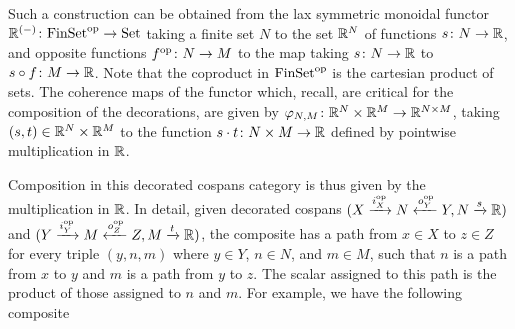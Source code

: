 Such a construction can be obtained from the lax symmetric monoidal functor
$\mathbb R^{(-)}{\colon} \mathrm{FinSet}^{\mathrm{op}} \to \mathrm{Set}$ taking a finite set $N$ to the set
${\mathbb{R}}^N$ of functions $s{\colon} N \to {\mathbb{R}}$, and opposite functions $f^{\mathrm{op}}{\colon} N \to
M$ to the map taking $s{\colon} N \to {\mathbb{R}}$ to $s \circ f {\colon} M \to {\mathbb{R}}$. Note that
the coproduct in $\mathrm{FinSet}^{\mathrm{op}}$ is the cartesian product of sets. The coherence
maps of the functor which, recall, are critical for the composition of the
decorations, are given by $\varphi_{N,M}{\colon} {\mathbb{R}}^N \times {\mathbb{R}}^M \to {\mathbb{R}}^{N\times
M}$, taking $(s,t) \in {\mathbb{R}}^N \times {\mathbb{R}}^M$ to the function $s \cdot t{\colon} N
\times M \to {\mathbb{R}}$ defined by pointwise multiplication in ${\mathbb{R}}$. 

Composition in this decorated cospans category is thus given by the
multiplication in ${\mathbb{R}}$. In detail, given decorated cospans $(X
\xrightarrow{i_X^{\mathrm{op}}} N \xleftarrow{o_Y^{\mathrm{op}}} Y, N \xrightarrow{s} {\mathbb{R}})$ and $(Y
\xrightarrow{i_Y^{\mathrm{op}}} M \xleftarrow{o_Z^{\mathrm{op}}} Z, M \xrightarrow{t} {\mathbb{R}})$, the
composite has a path from $x \in X$ to $z \in Z$ for every triple $(y,n,m)$
where $y \in Y$, $n \in N$, and $m \in M$, such that $n$ is a path from $x$ to
$y$ and $m$ is a path from $y$ to $z$. The scalar assigned to this path is the
product of those assigned to $n$ and $m$. For example, we have the following
composite
